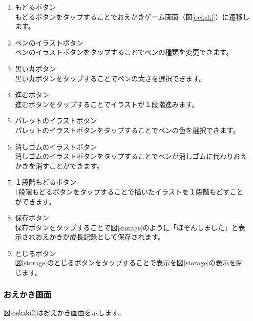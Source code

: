 \documentclass[a4j]{jarticle}
\begin{document}
\begin{enumerate}
  \renewcommand{\labelenumi}{\textcircled{\scriptsize \theenumi}}
\item もどるボタン\\
  もどるボタンをタップすることでおえかきゲーム画面（図\ref{oekaki}）に遷移します。
\item ペンのイラストボタン\\
  ペンのイラストボタンをタップすることでペンの種類を変更できます。
\item 黒い丸ボタン\\
  黒い丸ボタンをタップすることでペンの太さを選択できます。
\item 進むボタン\\
  進むボタンをタップすることでイラストが１段階進みます。
\item パレットのイラストボタン\\
  パレットのイラストボタンをタップすることでペンの色を選択できます。
\item 消しゴムのイラストボタン\\
  消しゴムのイラストボタンをタップすることでペンが消しゴムに代わりおえかきを消すことができます。
\item １段階もどるボタン\\
  1段階もどるボタンをタップすることで描いたイラストを１段階もどすことができます。
\item 保存ボタン\\
  保存ボタンをタップすることで図\ref{storage}のように「ほぞんしました」と表示されおえかきが成長記録として保存されます。
\item とじるボタン\\
  図\ref{storage}のとじるボタンをタップすることで表示を図\ref{storage}の表示を閉じます。
\end{enumerate}

\newpage
\subsubsection{おえかき画面}
図\ref{oekaki2}はおえかき画面を示します。\\
\end{document}
